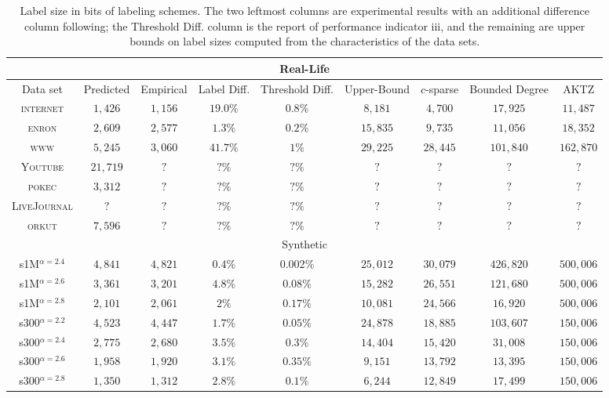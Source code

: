 \begin{table}
\small
\begin{tabular}{ccccccccc}
\hline \multicolumn{9}{c}{Real-Life}\\\hline
Data set&Predicted &Empirical & Label Diff. & Threshold Diff.   & Upper-Bound     &$c$-sparse &Bounded Degree \cite{adjiashvili2014labeling} &AKTZ \cite{alstrup2014adjacency}\\\hline
\textsc{internet}   &$1,426$    &$1,156$  & $19.0\%$  & $0.8\%$  & $8,181 $  &$4,700$      &$17,925$  &$11,487$\\
\textsc{enron}      &$2,609$    &$2,577$  & $1.3\%$ & $0.2\%$   & $15,835 $ &$9,735$      &$11,056$  &$18,352$\\
\textsc{www}        &$5,245$    &$3,060$  & $41.7\%$  & $1\%$  & $29,225 $ &$28,445$     &$101,840$ &$162,870$ \\
\textsc{Youtube}        &$21,719$    &$?$  & $?\%$  & $?\%$  & $? $ &$?$     &$?$ &$?$ \\
\textsc{pokec}        &$3,312$    &$?$  & $?\%$  & $?\%$  & $? $ &$?$     &$?$ &$?$ \\
\textsc{LiveJournal}        &$?$    &$?$  & $?\%$  & $?\%$  & $? $ &$?$     &$?$ &$?$ \\
\textsc{orkut}        &$7,596$    &$?$  & $?\%$  & $?\%$  & $? $ &$?$     &$?$ &$?$ \\\hline
\multicolumn{9}{c}{Synthetic}\\\hline
s1M$^{\alpha=2.4}$  &$4,841$    &$4,821$  & $0.4\%$ & $0.002\%$  & $25,012 $ &$30,079$     &$426,820$ &$500,006$\\
s1M$^{\alpha=2.6}$  &$3,361$    &$3,201$   & $4.8\%$ & $0.08\%$  & $15,282 $ &$26,551$     &$121,680$ &$500,006$\\
s1M$^{\alpha=2.8}$  &$2,101$    &$2,061$    & $2\%$ & $0.17\%$  & $10,081 $ &$24,566$     &$16,920$  &$500,006$\\
s300$^{\alpha=2.2}$ &$4,523$    &$4,447$  & $1.7\%$ & $0.05\%$  & $24,878 $ &$18,885$     &$103,607$ &$150,006$\\
s300$^{\alpha=2.4}$ &$2,775$    &$2,680$   & $3.5\%$  & $0.3\%$ & $14,404 $ &$15,420$     &$31,008$  &$150,006$\\
s300$^{\alpha=2.6}$ &$1,958$    &$1,920$  & $3.1\%$ & $0.35\%$   & $9,151 $  &$13,792$     &$13,395$  &$150,006$\\
s300$^{\alpha=2.8}$ &$1,350$    &$1,312$  & $2.8\%$ & $0.1\%$   & $6,244 $  &$12,849$     &$17,499$  &$150,006$\\\hline
\end{tabular}
\caption{Label size in bits of labeling schemes. The two leftmost columns are experimental results with an additional difference column following; the Threshold Diff. column is the report of performance indicator iii, and the remaining are upper bounds on label sizes computed from the characteristics of the data sets.}
\label{t:labelsizes}
\end{table}

